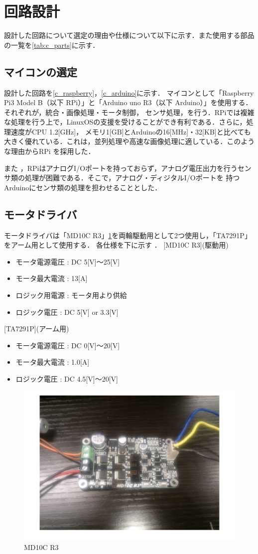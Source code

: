 \documentclass[10pt,a4j]{jarticle}
\begin{document}
\section{回路設計}
設計した回路について選定の理由や仕様について以下に示す．また使用する部品の一覧を\ref{tab:c_parts}に示す．
\subsection{マイコンの選定}
設計した回路を\ref{c_raspberry}，\ref{c_arduino}に示す．
マイコンとして「Raspberry Pi3 Model B（以下 RPi）」と「Arduino uno R3（以下 Arduino）」を使用する．それぞれが，統合・画像処理・モータ制御，
センサ処理，を行う．RPiでは複雑な処理を行う上で，LinuxOSの支援を受けることができ有利である．さらに，処理速度がCPU 1.2[GHz]，
メモリ1[GB]とArduinoの16[MHz]・32[KB]と比べても大きく優れている．これは，並列処理や高速な画像処理に適している．このような理由からRPi
を採用した．

また ，RPiはアナログI/Oポートを持っておらず，アナログ電圧出力を行うセンサ類の処理が困難である．そこで，アナログ・ディジタルI/Oポートを
持つArduinoにセンサ類の処理を担わせることとした．
\subsection{モータドライバ}
モータドライバは「MD10C R3」\ref{MD10C}を両輪駆動用として2つ使用し，「TA7291P」をアーム用として使用する．
各仕様を下に示す
．
[MD10C R3](駆動用)
\begin{itemize}
 \item モータ電源電圧 : DC 5[V]$〜$25[V]
 \item モータ最大電流 : 13[A]
 \item ロジック用電源 : モータ用より供給
 \item ロジック電圧   : DC 5[V] or 3.3[V]
\end{itemize}

[TA7291P](アーム用)
\begin{itemize}
 \item モータ電源電圧 : DC 0[V]$〜$20[V]
 \item モータ最大電流 : 1.0[A]
 \item ロジック電圧 : DC 4.5[V]$〜$20[V]
\end{itemize}
\begin{figure}[b]
 \centering
 \includegraphics[width=0.5\hsize]{MD10C.pdf}
    \caption{MD10C R3}
    \label{MD10C}
\end{figure}
\end{document}
